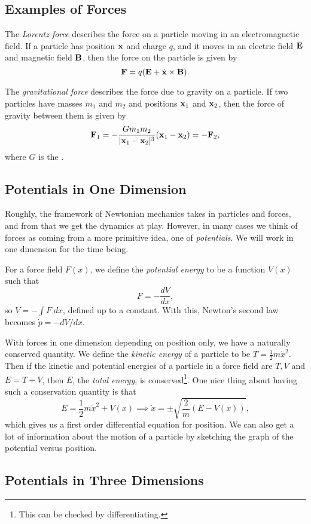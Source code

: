 \documentclass[a4paper]{scrartcl}
\begin{document}
\subsection{Examples of Forces}

The \emph{Lorentz force} describes the force on a particle moving in an electromagnetic field. If a particle has position $\mathbf{x}$ and charge $q$, and it moves in an electric field $\mathbf{E}$ and magnetic field $\mathbf{B}$, then the force on the particle is given by
$$
\mathbf{F} = q(\mathbf{E} + \dot{\mathbf{x}} \times \mathbf{B}).
$$


The \emph{gravitational force} describes the force due to gravity on a particle. If two particles have masses $m_1$ and $m_2$ and positions $\mathbf{x}_1$ and $\mathbf{x}_2$, then the force of gravity between them is given by
$$
\mathbf{F}_1 = - \frac{G m_1 m_2}{| \mathbf{x}_1 - \mathbf{x}_2|^3} (\mathbf{x}_1 - \mathbf{x}_2) = - \mathbf{F}_2,
$$
where $G$ is the .


\subsection{Potentials in One Dimension}

Roughly, the framework of Newtonian mechanics takes in particles and forces, and from that we get the dynamics at play. However, in many cases we think of forces as coming from a more primitive idea, one of \emph{potentials}. We will work in one dimension for the time being.

For a force field $F(x)$, we define the \emph{potential energy} to be a function $V(x)$ such that
$$
F = - \frac{dV}{dx},
$$
so $V = -\int F \; dx$, defined up to a constant. With this, Newton's second law becomes $\dot{p} = -dV/dx$.

With forces in one dimension depending on position only, we have a naturally conserved quantity. We define the \emph{kinetic energy} of a particle to be $T = \frac{1}{2}m \dot{x}^2$. Then if the kinetic and potential energies of a particle in a force field are $T, V$ and $E = T + V$, then $E$, the \emph{total energy}, is conserved\footnote{This can be checked by differentiating.}. One nice thing about having such a conservation quantity is that
$$
E = \frac{1}{2}m \dot{x}^2 + V(x) \implies  \dot{x} = \pm \sqrt{\frac{2}{m} (E - V(x))},
$$
which gives us a first order differential equation for position. We can also get a lot of information about the motion of a particle by sketching the graph of the potential versus position.

\subsection{Potentials in Three Dimensions}
\end{document}
